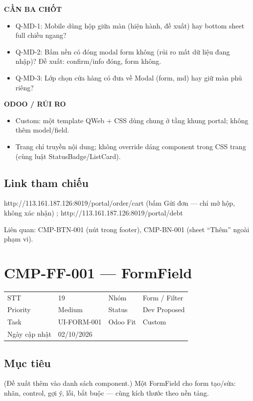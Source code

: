 \documentclass[11pt,a4paper]{report}
\begin{document}
\par\smallskip\textbf{CẦN BA CHỐT}\par
\begin{itemize}
\item Q-MD-1: Mobile dùng hộp giữa màn (hiện hành, đề xuất) hay bottom sheet full chiều ngang?
\item Q-MD-2: Bấm nền có đóng modal form không (rủi ro mất dữ liệu đang nhập)? Đề xuất: confirm/\allowbreak{}info đóng, form không.
\item Q-MD-3: Lớp chọn cửa hàng có đưa về Modal (form, md) hay giữ màn phủ riêng?
\end{itemize}

\par\smallskip\textbf{ODOO / RỦI RO}\par
\begin{itemize}
\item Custom: một template QWeb + CSS dùng chung ở tầng khung portal; không thêm model/\allowbreak{}field.
\item Trang chỉ truyền nội dung; không override dáng component trong CSS trang (cùng luật StatusBadge/\allowbreak{}ListCard).
\end{itemize}
\subsection*{Link tham chiếu}
http://113.161.187.126:8019/\allowbreak{}portal/\allowbreak{}order/\allowbreak{}cart (bấm Gửi đơn — chỉ mở hộp, không xác nhận) ; http://113.161.187.126:8019/\allowbreak{}portal/\allowbreak{}debt\par
Liên quan: CMP-BTN-001 (nút trong footer), CMP-BN-001 (sheet “Thêm” ngoài phạm vi).\par
\clearpage
\section{CMP-FF-001 --- FormField}
\begin{tabularx}{\textwidth}{@{}l X l X@{}}\toprule
STT & 19 & Nhóm & Form / Filter\\
Priority & Medium & Status & Dev Proposed\\
Task & UI-FORM-001 & Odoo Fit & Custom\\
Ngày cập nhật & 02/10/2026 & & \\\bottomrule\end{tabularx}
\subsection*{Mục tiêu}
(Đề xuất thêm vào danh sách component.) Một FormField cho form tạo/\allowbreak{}sửa: nhãn, control, gợi ý, lỗi, bắt buộc — cùng kích thước theo nền tảng.\par
\end{document}

